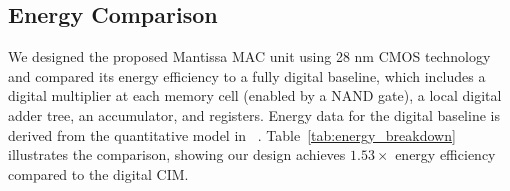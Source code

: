 
\subsection{Energy Comparison}

We designed the proposed Mantissa MAC unit using 28 nm CMOS technology and compared its energy efficiency to a fully digital baseline, which includes a digital multiplier at each memory cell (enabled by a NAND gate), a local digital adder tree, an accumulator, and registers.
Energy data for the digital baseline is derived from the quantitative model in ~\cite{sun2023analog}. 
Table~\ref{tab:energy_breakdown} illustrates the comparison, showing our design achieves $1.53\times$ energy efficiency compared to the digital CIM.








\iffalse

Energy breakdown from the Quantitative model of paper ~\cite{sun2023analog}, scale the sub-ADD and sub-MUL with capacitance, delay, area of single NAND2 gate. The traditional fully digital CIM macro consists of a 6T-SRAM and a NAND gate. It totally has 10 transistors (4 PMOS and 6 NMOS) which is the same as our macro. Thus, the configuration like capacitance, area and delay will be close. The result of this comparison is convincing. From the Table.{ \label{energy_breakdown}} , it captured the energy of sub-ADD, sub-MUL and baseline which is DCIM. The energy efficiency of our design is 34.8\% than DCIM.

\fi


